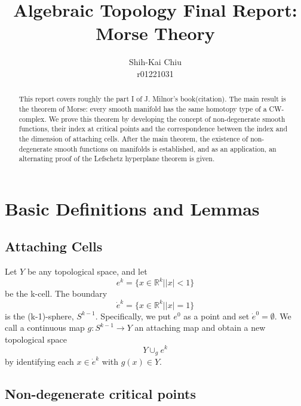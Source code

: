 \documentclass[12pt]{article}
\newcommand{\RR}{\mathbb{R}}      %
\begin{document}
\nocite{*}

\title{Algebraic Topology Final Report: Morse Theory}

\author{Shih-Kai Chiu \\
r01221031}

\maketitle

\begin{abstract}
  This report covers roughly the part I of J. Milnor's book(citation). The main
  result is the theorem of Morse: every smooth manifold has the same homotopy
  type of a CW-complex. We prove this theorem by developing the concept of
  non-degenerate smooth functions, their index at critical points and the
  correspondence between the index and the dimension of attaching cells. After
  the main theorem, the existence of non-degenerate smooth functions on
  manifolds is established, and as an application, an alternating proof of the
  Lefschetz hyperplane theorem is given.
\end{abstract}


\section{Basic Definitions and Lemmas}


\subsection{Attaching Cells}

Let $Y$ be any topological space, and let
\begin{equation}
  e^k = \{ x \in \RR^k | \left| x \right| < 1 \}
\end{equation}
be the k-cell. The boundary
\begin{equation}
  \dot{e}^k = \{ x \in \RR^k | \left| x \right| = 1 \}
\end{equation}
is the (k-1)-sphere, $S^{k-1}$. Specifically, we put $e^0$ as a point and set
$\dot{e}^0 = \emptyset$. We call a continuous map $g: S^{k-1} \to Y$ an
attaching map and obtain a new topological space
\begin{equation}
  Y \cup_g e^k
\end{equation}
by identifying each $x \in \dot{e}^k$ with $g(x) \in Y$.


\subsection{Non-degenerate critical points}
\end{document}
